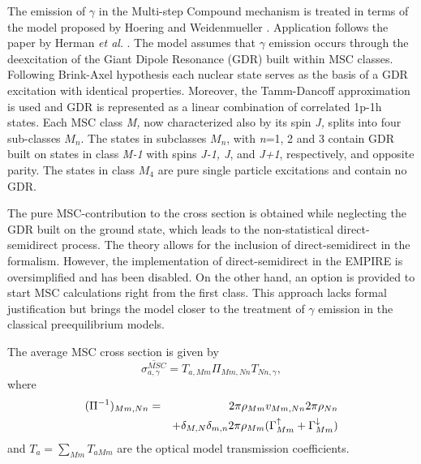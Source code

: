 The emission of $\gamma$ in the Multi-step Compound%
 mechanism is treated in terms of the model proposed by Hoering
and Weidenmueller \cite{GammaMSC}. Application follows the paper by Herman
\emph{et al}. \cite{GammaMSCapp}. The model assumes that $\gamma$ emission
occurs through the deexcitation of the Giant Dipole Resonance (GDR) built
within MSC%
 classes. Following Brink-Axel hypothesis \cite{Axel,Brink,Brinka}
each nuclear state serves as the basis of a GDR excitation with identical
properties. Moreover, the Tamm-Dancoff approximation is used and GDR is
represented as a linear combination of correlated 1p-1h states. Each MSC
class \emph{M,} now characterized also by its spin \emph{J,} splits into
four sub-classes $M_{n}$. The states in subclasses $M_{n}$, with \emph{n}=1,
2 and 3 contain GDR built on states in class \emph{M-1} with spins \emph{%
J-1, J}, and \emph{J+1}, respectively, and opposite parity. The states in
class $M_{4}$ are pure single particle excitations and contain no GDR.

The pure MSC-contribution to the cross section is obtained while neglecting
the GDR built on the ground state, which leads to the non-statistical
direct-semidirect process. The theory \cite{GammaMSC} allows for the
inclusion of direct-semidirect in the formalism. However, the implementation
of direct-semidirect in the EMPIRE is oversimplified and has been disabled.
On the other hand, an option is provided to start MSC%
 calculations right from the first class. This approach lacks
formal justification but brings the model closer to the treatment of $\gamma$
emission in the classical preequilibrium models.

The average MSC cross section is given by
\begin{equation}
\overline{\sigma_{a,\gamma}^{MSC}}=T_{a,Mm}\Pi_{Mm,Nn}T_{Nn,\gamma},
\label{GammaMSCxs}
\end{equation}
where
\begin{eqnarray}
(\Pi^{-1})_{Mm,Nn} & = & 2\pi\rho_{Mm}v_{Mm,Nn}2\pi\rho_{Nn}  \nonumber \\
& &
+\delta_{M,N}\delta_{m,n}2\pi\rho_{Mm}(\Gamma_{Mm}^{\uparrow}+\Gamma_{Mm}^{%
\downarrow})  \label{Pigamma}
\end{eqnarray}
and $T_{a}=\sum_{Mm}T_{aMm}$ are the optical model transmission coefficients.

